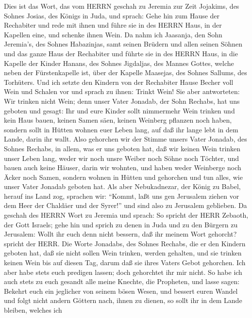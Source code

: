  Dies ist das Wort, das vom HERRN geschah zu Jeremia zur
Zeit Jojakims, des Sohnes Josias, des Königs in Juda, und sprach:
 Gehe hin zum Hause der Rechabiter und rede mit ihnen und
führe sie in des HERRN Haus, in der Kapellen eine, und schenke ihnen
Wein.  Da nahm ich Jaasanja, den Sohn Jeremia's, des Sohnes
Habazinjas, samt seinen Brüdern und allen seinen Söhnen und das ganze
Haus der Rechabiter  und führte sie in des HERRN Haus, in
die Kapelle der Kinder Hanans, des Sohnes Jigdaljas, des Mannes Gottes,
welche neben der Fürstenkapelle ist, über der Kapelle Maasejas, des
Sohnes Sallums, des Torhüters.  Und ich setzte den Kindern
von der Rechabiter Hause Becher voll Wein und Schalen vor und sprach zu
ihnen: Trinkt Wein!  Sie aber antworteten: Wir trinken nicht
Wein; denn unser Vater Jonadab, der Sohn Rechabs, hat uns geboten und
gesagt: Ihr und eure Kinder sollt nimmermehr Wein trinken 
und kein Haus bauen, keinen Samen säen, keinen Weinberg pflanzen noch
haben, sondern sollt in Hütten wohnen euer Leben lang, auf daß ihr lange
lebt in dem Lande, darin ihr wallt.  Also gehorchen wir der
Stimme unsers Vater Jonadab, des Sohnes Rechabs, in allem, was er uns
geboten hat, daß wir keinen Wein trinken unser Leben lang, weder wir
noch unsre Weiber noch Söhne noch Töchter,  und bauen auch
keine Häuser, darin wir wohnten, und haben weder Weinberge noch Äcker
noch Samen,  sondern wohnen in Hütten und gehorchen und tun
alles, wie unser Vater Jonadab geboten hat.  Als aber
Nebukadnezar, der König zu Babel, herauf ins Land zog, sprachen wir:
``Kommt, laßt uns gen Jerusalem ziehen vor dem Heer der Chaldäer und der
Syrer!'' und sind also zu Jerusalem geblieben.  Da geschah
des HERRN Wort zu Jeremia und sprach:  So spricht der HERR
Zebaoth, der Gott Israels; gehe hin und sprich zu denen in Juda und zu
den Bürgern zu Jerusalem: Wollt ihr euch denn nicht bessern, daß ihr
meinem Wort gehorcht? spricht der HERR.  Die Worte
Jonadabs, des Sohnes Rechabs, die er den Kindern geboten hat, daß sie
nicht sollen Wein trinken, werden gehalten, und sie trinken keinen Wein
bis auf diesen Tag, darum daß sie ihres Vaters Gebot gehorchen. Ich aber
habe stets euch predigen lassen; doch gehorchtet ihr mir nicht.
 So habe ich auch stets zu euch gesandt alle meine Knechte,
die Propheten, und lasse sagen: Bekehrt euch ein jeglicher von seinem
bösen Wesen, und bessert euren Wandel und folgt nicht andern Göttern
nach, ihnen zu dienen, so sollt ihr in dem Lande bleiben, welches ich
